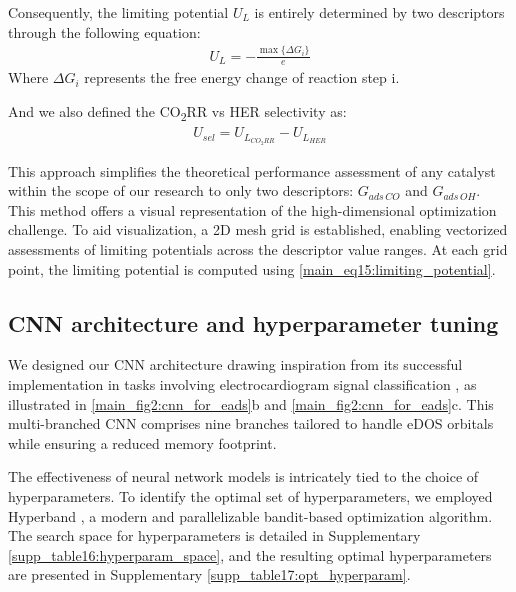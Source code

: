     Consequently, the limiting potential $\textit{U}_{L}$ is entirely determined by two descriptors through the following equation:
    \begin{align}
    U_L = -\frac{\max\{ \Delta G_i \}}{e}  \label{main_eq15:limiting_potential}
    \end{align}
    Where $\Delta G_{i}$ represents the free energy change of reaction step i.

    And we also defined the CO\textsubscript{2}RR vs HER selectivity as:
    \begin{align}
    U_{sel} = U_{L_{CO_{2}RR}} - U_{L_{HER}}  \label{main_eq16:selectivity}
    \end{align}

    This approach simplifies the theoretical performance assessment of any catalyst within the scope of our research to only two descriptors:
    $G_{\textit{ads} \, \textit{CO}}$ and $G_{\textit{ads} \, \textit{OH}}$.
    This method offers a visual representation of the high-dimensional optimization challenge.
    To aid visualization, a 2D mesh grid is established, enabling vectorized assessments of limiting potentials across the descriptor value ranges.
    At each grid point, the limiting potential is computed using \cref{main_eq15:limiting_potential}.


    \subsection{CNN architecture and hyperparameter tuning}
    We designed our CNN architecture drawing inspiration from its successful implementation in tasks involving electrocardiogram signal classification \cite{weimann2021transfer}, as illustrated in \cref{main_fig2:cnn_for_eads}b and \cref{main_fig2:cnn_for_eads}c.
    This multi-branched CNN comprises nine branches tailored to handle eDOS orbitals while ensuring a reduced memory footprint.

    The effectiveness of neural network models is intricately tied to the choice of hyperparameters.
    To identify the optimal set of hyperparameters, we employed Hyperband \cite{li2018hyperband}, a modern and parallelizable bandit-based optimization algorithm.
    The search space for hyperparameters is detailed in Supplementary \cref{supp_table16:hyperparam_space}, and the resulting optimal hyperparameters are presented in Supplementary \cref{supp_table17:opt_hyperparam}.


